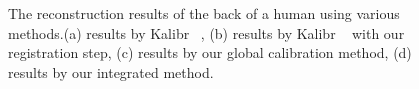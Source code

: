 \begin{figure}[ht]
{\begin{minipage}[c]{.22\linewidth}
\end{minipage}
}
\caption{The reconstruction results of the back of a human using various methods.(a) results by Kalibr ~\cite{Maye2013Self}, (b) results by Kalibr ~\cite{Maye2013Self} with our registration step, (c) results by our global calibration method, (d) results by our integrated method.}
\label{fig:pointcloud}
\end{figure}

\begin{figure}[ht]
  \centering
{}%
\end{figure}
